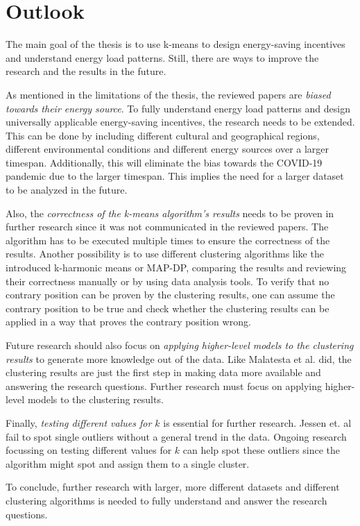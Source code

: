 
\section{Outlook}
\label{sec:outlook}
The main goal of the thesis is to use k-means to design energy-saving incentives and understand energy load patterns.
Still, there are ways to improve the research and the results in the future.

As mentioned in the limitations of the thesis, the reviewed papers are \textit{biased towards their energy source}.
To fully understand energy load patterns and design universally applicable energy-saving incentives, the research needs to be extended.
This can be done by including different cultural and geographical regions, different environmental conditions and different energy sources over a larger timespan.
Additionally, this will eliminate the bias towards the COVID-19 pandemic due to the larger timespan.
This implies the need for a larger dataset to be analyzed in the future.

Also, the \textit{correctness of the k-means algorithm's results} needs to be proven in further research since it was not communicated in the reviewed papers.
The algorithm has to be executed multiple times to ensure the correctness of the results.
Another possibility is to use different clustering algorithms like the introduced k-harmonic means or MAP-DP, comparing the results and reviewing their correctness manually or by using data analysis tools.
To verify that no contrary position can be proven by the clustering results, one can assume the contrary position to be true and check whether the clustering results can be applied in a way that proves the contrary position wrong.

Future research should also focus on \textit{applying higher-level models to the clustering results} to generate more knowledge out of the data.
Like Malatesta et al. \cite{MAL-HBP} did, the clustering results are just the first step in making data more available and answering the research questions.
Further research must focus on applying higher-level models to the clustering results.

Finally, \textit{testing different values for $k$} is essential for further research.
Jessen et. al \cite{JES-IND} fail to spot single outliers without a general trend in the data.
Ongoing research focussing on testing different values for $k$ can help spot these outliers since the algorithm might spot and assign them to a single cluster.

To conclude, further research with larger, more different datasets and different clustering algorithms is needed to fully understand and answer the research questions.